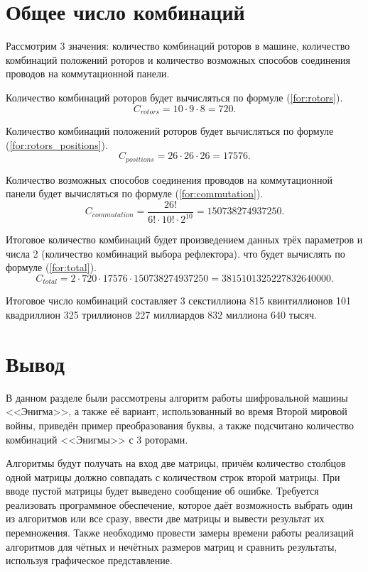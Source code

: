 \section{Общее число комбинаций}

Рассмотрим 3 значения: количество комбинаций роторов в машине, количество комбинаций положений роторов и количество возможных способов соединения проводов на коммутационной панели. 

Количество комбинаций роторов будет вычисляться по формуле (\ref{for:rotors}).
\begin{equation}
	\label{for:rotors}
	C_{rotors} = 10 \cdot 9 \cdot 8 = 720.
\end{equation}

Количество комбинаций положений роторов будет вычисляться по формуле (\ref{for:rotors_positions}).
\begin{equation}
	\label{for:rotors_positions}
	C_{positions} = 26 \cdot 26 \cdot 26 = 17576.
\end{equation}

Количество возможных способов соединения проводов на коммутационной панели будет вычисляться по формуле (\ref{for:commutation}).
\begin{equation}
	\label{for:commutation}
	C_{commutation} = \frac{26!}{6! \cdot 10! \cdot 2^{10}} = 150 738 274 937 250.
\end{equation}

Итоговое количество комбинаций будет произведением данных трёх параметров и числа 2 (количество комбинаций выбора рефлектора). что будет вычислять по формуле (\ref{for:total}).
\begin{equation}
	\label{for:total}
	C_{total} = 2 \cdot 720 \cdot 17576  \cdot 150 738 274 937 250 = 3 815 101 325 227 832 640 000.
\end{equation}

Итоговое число комбинаций составляет 3 секстиллиона 815 квинтиллионов 101 квадриллион 325 триллионов 227 миллиардов 832 миллиона 640 тысяч.

\section*{Вывод}

В данном разделе были рассмотрены алгоритм работы шифровальной машины <<Энигма>>, а также её вариант, использованный во время Второй мировой войны, приведён пример преобразования буквы, а также подсчитано количество комбинаций <<Энигмы>> с 3 роторами.

Алгоритмы будут получать на вход две матрицы, причём количество столбцов одной матрицы должно совпадать с количеством строк второй матрицы. 
При вводе пустой матрицы будет выведено сообщение об ошибке. 
Требуется реализовать программное обеспечение, которое даёт возможность выбрать один из алгоритмов или все сразу, ввести две матрицы и вывести результат их перемножения.
Также необходимо провести замеры времени работы реализаций алгоритмов для чётных и нечётных размеров матриц и сравнить результаты, используя графическое представление.
